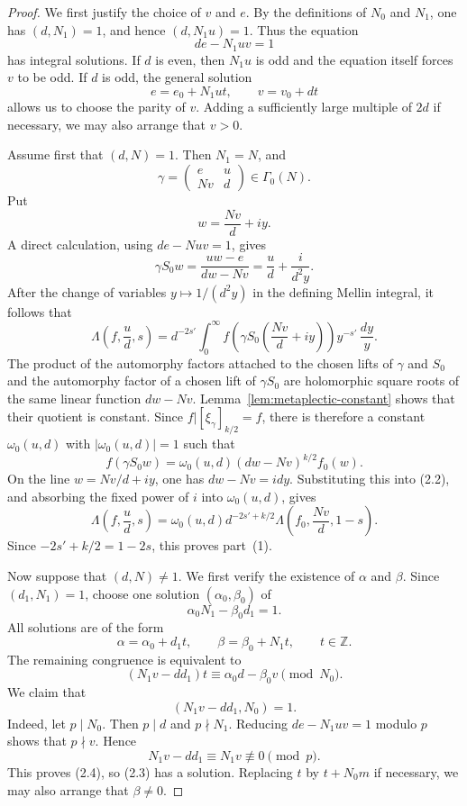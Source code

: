 \documentclass[10pt,a4paper]{amsart}
\newcommand{\Z}{\mathbb Z}
\begin{document}
\begin{proof}
We first justify the choice of $v$ and $e$. By the definitions of $N_0$ and
$N_1$, one has $(d,N_1)=1$, and hence $(d,N_1u)=1$. Thus the equation
\[
de-N_1uv=1
\]
has integral solutions. If $d$ is even, then $N_1u$ is odd and the equation
itself forces $v$ to be odd. If $d$ is odd, the general solution
\[
e=e_0+N_1ut,\qquad v=v_0+dt
\]
allows us to choose the parity of $v$. Adding a sufficiently large multiple
of $2d$ if necessary, we may also arrange that $v>0$.

Assume first that $(d,N)=1$. Then $N_1=N$, and
\[
\gamma=\begin{pmatrix}e&u\\Nv&d\end{pmatrix}\in\Gamma_0(N).
\]
Put
\[
w=\frac{Nv}{d}+iy.
\]
A direct calculation, using $de-Nuv=1$, gives
\[
\gamma S_0w
=\frac{u w-e}{d w-Nv}
=\frac ud+\frac{i}{d^2y}.
\tag{2.1}
\]
After the change of variables $y\mapsto 1/(d^2y)$ in the defining Mellin
integral, it follows that
\[
\Lambda\left(f,\frac ud,s\right)
=d^{-2s'}\int_0^\infty
f\left(\gamma S_0\left(\frac{Nv}{d}+iy\right)\right)
y^{-s'}\,\frac{dy}{y}.
\tag{2.2}
\]
The product of the automorphy factors attached to the chosen lifts of
$\gamma$ and $S_0$ and the automorphy factor of a chosen lift of
$\gamma S_0$ are holomorphic square roots of the same linear function
$d w-Nv$. Lemma~\ref{lem:metaplectic-constant} shows that their quotient
is constant. Since $f|[\xi_\gamma]_{k/2}=f$, there is therefore a constant
$\omega_0(u,d)$ with $|\omega_0(u,d)|=1$ such that
\[
f(\gamma S_0w)
=\omega_0(u,d)(d w-Nv)^{k/2}f_0(w).
\]
On the line $w=Nv/d+iy$, one has $d w-Nv=idy$. Substituting this into
(2.2), and absorbing the fixed power of $i$ into $\omega_0(u,d)$, gives
\[
\Lambda\left(f,\frac ud,s\right)
=\omega_0(u,d)d^{-2s'+k/2}
\Lambda\left(f_0,\frac{Nv}{d},1-s\right).
\]
Since $-2s'+k/2=1-2s$, this proves part~\textup{(1)}.

Now suppose that $(d,N)\ne1$. We first verify the existence of $\alpha$
and $\beta$. Since $(d_1,N_1)=1$, choose one solution $(\alpha_0,\beta_0)$
of
\[
\alpha_0N_1-\beta_0d_1=1.
\]
All solutions are of the form
\[
\alpha=\alpha_0+d_1t,
\qquad
\beta=\beta_0+N_1t,
\qquad t\in\Z.
\]
The remaining congruence is equivalent to
\[
(N_1v-dd_1)t\equiv \alpha_0d-\beta_0v\pmod{N_0}.
\tag{2.3}
\]
We claim that
\[
(N_1v-dd_1,N_0)=1.
\tag{2.4}
\]
Indeed, let $p\mid N_0$. Then $p\mid d$ and $p\nmid N_1$. Reducing
$de-N_1uv=1$ modulo $p$ shows that $p\nmid v$. Hence
\[
N_1v-dd_1\equiv N_1v\not\equiv0\pmod p.
\]
This proves (2.4), so (2.3) has a solution. Replacing $t$ by $t+N_0m$ if
necessary, we may also arrange that $\beta\ne0$.


\end{proof}
\end{document}
